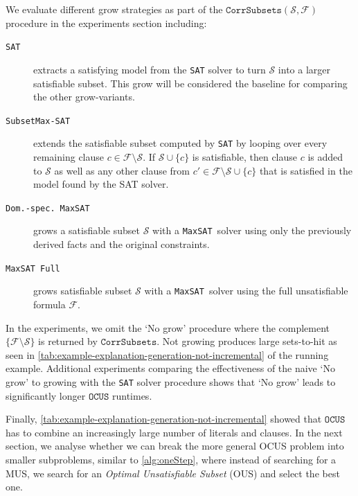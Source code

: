 \documentclass[twoside,11pt]{article}
\newcommand\m[1]{\mathcal{#1}}
\newcommand\formula{\ensuremath{\m{F} }\xspace}
\newcommand\mm[1]{\ensuremath{#1}\xspace}
\newcommand\call[1]{\mm{\texttt{#1}}}
\newcommand\sat{\texttt{{SAT}}\xspace}
\newcommand\subsetmaxsat{\texttt{SubsetMax-SAT}}
\newcommand\grow{\mm{\call{Grow}}}
\newcommand\comus{\mm{\call{OCUS}}}
\newcommand\corrsubsets{\mm{\call{CorrSubsets}}}
\newcommand\maxsat{\texttt{MaxSAT}}
\newcommand\domspecmaxsat{\texttt{Dom.-spec.}~\texttt{MaxSAT}}
\newcommand\maxsatfull{\texttt{MaxSAT Full}}
\begin{document}
	We evaluate different grow strategies as part of the $\corrsubsets(\m{S}, \formula)$ procedure in the experiments section including:
	\begin{description}
		\item[\sat] extracts a satisfying model from the \sat solver to turn $\m{S}$ into a larger satisfiable subset. This grow will be considered the baseline for comparing the other grow-variants.
		\item[\subsetmaxsat] extends the satisfiable subset computed by \sat by looping over every remaining clause $c \in \formula \setminus \m{S}$.  If $\m{S} \cup \{c\}$ is satisfiable, then clause $c$ is added to $\m{S}$ as well as any other clause from $c' \in \formula \setminus \m{S} \cup \{c\}$ that is satisfied in the model found by the SAT solver. 
		\item[\domspecmaxsat] grows a satisfiable subset $\m{S}$ with a \maxsat~solver using only the previously derived facts and the original constraints. %
		\item[\maxsatfull] grows satisfiable subset $\m{S}$ with a \maxsat~solver using the full unsatisfiable formula $\mathcal{F}$.
	\end{description} 
	In the experiments, we omit the `No grow' procedure where the complement $\{\formula \setminus \m{S}\}$ is returned by \corrsubsets. Not growing produces large sets-to-hit as seen in \cref{tab:example-explanation-generation-not-incremental} of the running example.
	Additional experiments comparing the effectiveness of the naive `No grow' to growing with the \sat solver procedure shows that `No grow' leads to significantly longer \comus runtimes.

	Finally, \cref{tab:example-explanation-generation-not-incremental} showed that \comus has to combine an increasingly large number of literals and clauses. In the next section, we analyse whether we can break the more general OCUS problem into smaller subproblems, similar to \cref{alg:oneStep}, where instead of searching for a MUS, we search for an \emph{Optimal Unsatisfiable Subset} (OUS) and select the best one.

	
\end{document}
